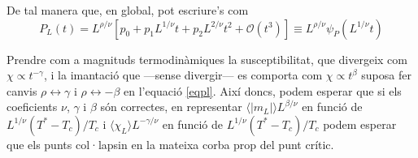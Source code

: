 \documentclass[a4paper]{article}
\begin{document}
De tal manera que, en global, pot escriure's com
\begin{equation} \label{eqpl}
    P_L (t) = L^{\rho/\nu} \left[p_0 + p_1 L^{1/\nu}t + p_2 L^{2/\nu}t^2 + \mathcal{O}(t^3) \right] \equiv L^{\rho/\nu} \psi_P(L^{1/\nu}t)
\end{equation}

Prendre com a magnituds termodinàmiques la susceptibilitat, que divergeix com $\chi \propto t^{-\gamma}$, i la imantació que ---sense divergir--- es comporta com $\chi \propto t^{\beta}$ suposa fer canvis $\rho \leftrightarrow \gamma$ i $\rho \leftrightarrow -\beta$ en l'equació \eqref{eqpl}. Així doncs, podem esperar que si els coeficients $\nu$, $\gamma$ i $\beta$ són correctes, en representar $\langle |m_L| \rangle L^{\beta/\nu}$ en funció de $L^{1/\nu} (T^*-T_c)/T_c$ i $\langle \chi_L \rangle L^{-\gamma/\nu}$ en funció de $L^{1/\nu} (T^*-T_c)/T_c$ podem esperar que els punts col·lapsin en la mateixa corba prop del punt crític.
\end{document}
